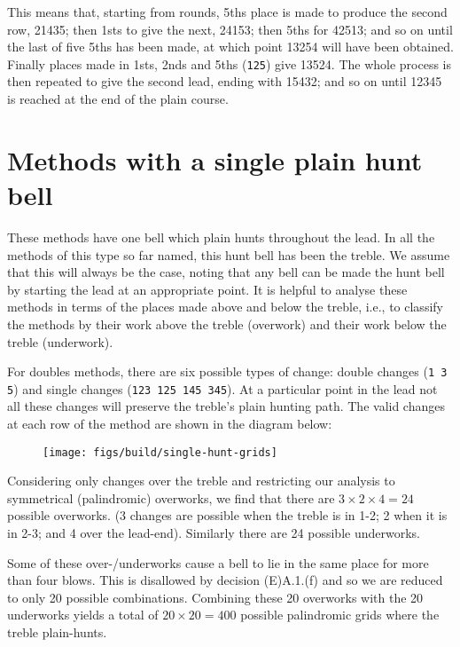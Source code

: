 This means that, starting from rounds,
5ths place is made to produce the second row, 21435;
then 1sts to give the next, 24153;
then 5ths for 42513;
and so on until the last of five 5ths has been made,
at which point 13254 will have been obtained.
Finally places made in 1sts, 2nds and 5ths ({\tt 125}) give 13524.
The whole process is then repeated to give the second lead, ending with 15432;
and so on until 12345 is reached at the end of the plain course.

\section{Methods with a single plain hunt bell} \label{sec:intro-single-hunt}

These methods have one bell which plain hunts throughout the lead.
In all the methods of this type so far named,
this hunt bell has been the treble.
We assume that this will always be the case, noting that any bell can be made
the hunt bell by starting the lead at an appropriate point.
It is helpful to analyse these methods in terms of the places made above and
below the treble,
i.e., to classify the methods by their work above the treble (overwork) and
their work below the treble (underwork).

For doubles methods, there are six possible types of change:
double changes ({\tt 1 3 5}) and single changes ({\tt 123 125 145 345}).
At a particular point in the lead not all these changes will preserve the
treble's plain hunting path.
The valid changes at each row of the method are shown in the diagram below:

\begin{figure}[h]
  \centering
  \texttt{[image: figs/build/single-hunt-grids]}
\end{figure}

Considering only changes over the treble and restricting our analysis to
symmetrical (palindromic) overworks,
we find that there are \(3 \times 2 \times 4 = 24\) possible overworks.
(3 changes are possible when the treble is in 1-2;
2 when it is in 2-3; and 4 over the lead-end).
Similarly there are 24 possible underworks.

Some of these over-/underworks cause a bell to lie in the same place for more
than four blows.
This is disallowed by decision (E)A.1.(f) and so we are reduced to only 20
possible combinations.
Combining these 20 overworks with the 20 underworks yields a total of
\(20 \times 20 = 400\) possible palindromic grids where the treble plain-hunts.

